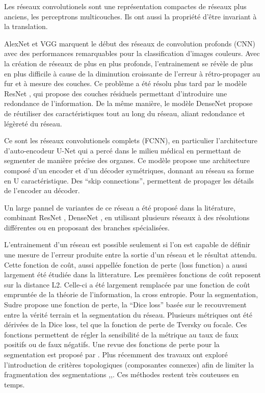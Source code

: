 Les réseaux convolutionels sont une représentation compactes de réseaux plus anciens, les perceptrons multicouches. Ils ont aussi la propriété d'être invariant à la translation.

AlexNet \cite{krizhevsky2012_AlexNet} et VGG \cite{Simonyan2014_VGG} marquent le début des réseaux de convolution profonds (CNN) avec des performances remarquables pour la classification d'images couleurs. Avec la création de réseaux de plus en plus profonds, l'entrainement se révèle de plus en plus difficile à cause de la diminution croissante de l'erreur à rétro-propager au fur et à mesure des couches. Ce problème a été résolu plus tard par le modèle ResNet \cite{He2016_ResNet}, qui propose des couches résiduels permettant d'introduire une redondance de l'information. De la même manière, le modèle DenseNet \cite{Huang2017_DenseNet} propose de réutiliser des caractéristiques tout au long du réseau, aliant redondance et légèreté du réseau.

Ce sont les réseaux convolutionels complets (FCNN), en particulier l'architecture d'auto-encodeur U-Net \cite{Ronneberger2015_Unet} qui a percé dans le milieu médical en permettant de segmenter de manière précise des organes. Ce modèle propose une architecture composé d'un encoder et d'un décoder symétriques, donnant au réseau sa forme en U caractéristique. Des ``skip connections'', permettent de propager les détails de l'encoder au décoder.

Un large pannel de variantes de ce réseau a été proposé dans la litérature, combinant ResNet \cite{yu2019_liver_ResUnet}, DenseNet \cite{Li2018_DenseUnet}, en utilisant plusieurs réseaux à des résolutions différentes ou en proposant des branches spécialisées.

L'entrainement d'un réseau est possible seulement si l'on est capable de définir une mesure de l'erreur produite entre la sortie d'un réseau et le résultat attendu. Cette fonction de coût, aussi appellée fonction de perte (loss function) a aussi largement été étudiée dans la litterature. Les premières fonctions de coût reposent sur la distance L2. Celle-ci a été largement remplacée par une fonction de coût empruntée de la théorie de l'information, la cross entropie. Pour la segmentation, Sudre \cite{Sudre2017_DiceLoss} propose une fonction de perte, la ``Dice loss'' basée sur le recouvrement entre la vérité terrain et la segmentation du réseau. Plusieurs métriques ont été dérivées de la Dice loss, tel que la fonction de perte de Tversky ou focale. Ces fonctions permettent de régler la sensibilité de la métrique au taux de faux positifs ou de faux négatifs. Une revue des fonctions de perte pour la segmentation est proposé par \cite{Jadon2020_survey_seg_loss}. Plus récemment des travaux ont exploré l'introduction de critères topologiques (composantes connexes) afin de limiter la fragmentation des segmentations \cite{Hu2019_topo_homo_persi},\cite{Clough2019_topo_homo_persi},\cite{Ventura2017iterative_topo}. Ces méthodes restent très couteuses en temps.


